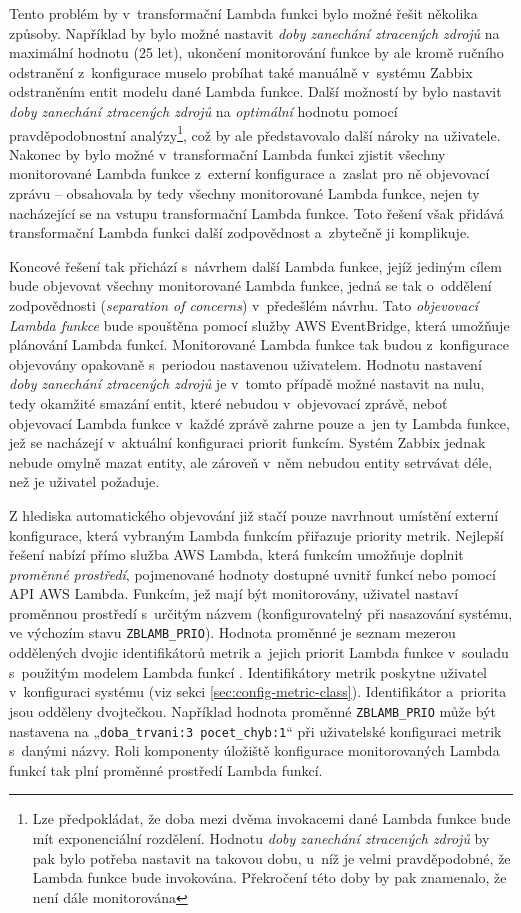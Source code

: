 \documentclass[czech, ing, kiv, he, iso690]{fasthesis}
\begin{document}
Tento problém by v~transformační Lambda funkci bylo možné řešit několika způsoby. Například by bylo možné nastavit \emph{doby zanechání ztracených zdrojů} na maximální hodnotu (25 let), ukončení monitorování funkce by ale kromě ručního odstranění z~konfigurace muselo probíhat také manuálně v~systému Zabbix odstraněním entit modelu dané Lambda funkce. Další možností by bylo nastavit \emph{doby zanechání ztracených zdrojů} na \emph{optimální} hodnotu pomocí pravděpodobnostní analýzy\footnote{Lze předpokládat, že doba mezi dvěma invokacemi dané Lambda funkce bude mít exponenciální rozdělení. Hodnotu \emph{doby zanechání ztracených zdrojů} by pak bylo potřeba nastavit na takovou dobu, u~níž je velmi pravděpodobné, že Lambda funkce bude invokována. Překročení této doby by pak znamenalo, že není dále monitorována}, což by ale představovalo další nároky na uživatele. Nakonec by bylo možné v~transformační Lambda funkci zjistit všechny monitorované Lambda funkce z~externí konfigurace a~zaslat pro ně objevovací zprávu -- obsahovala by tedy všechny monitorované Lambda funkce, nejen ty nacházející se na vstupu transformační Lambda funkce. Toto řešení však přidává transformační Lambda funkci další zodpovědnost a~zbytečně ji komplikuje.

Koncové řešení tak přichází s~návrhem další Lambda funkce, jejíž jediným cílem bude objevovat všechny monitorované Lambda funkce, jedná se tak o~oddělení zodpovědnosti (\emph{separation of concerns}) v~předešlém návrhu. Tato \emph{objevovací Lambda funkce} bude spouštěna pomocí služby AWS EventBridge, která umožňuje plánování Lambda funkcí. Monitorované Lambda funkce tak budou z~konfigurace objevovány opakovaně s~periodou nastavenou uživatelem. Hodnotu nastavení \emph{doby zanechání ztracených zdrojů} je v~tomto případě možné nastavit na nulu, tedy okamžité smazání entit, které nebudou v~objevovací zprávě, neboť objevovací Lambda funkce v~každé zprávě zahrne pouze a~jen ty Lambda funkce, jež se nacházejí v~aktuální konfiguraci priorit funkcím. Systém Zabbix jednak nebude omylně mazat entity, ale zároveň v~něm nebudou entity setrvávat déle, než je uživatel požaduje. 

Z hlediska automatického objevování již stačí pouze navrhnout umístění externí konfigurace, která vybraným Lambda funkcím přiřazuje priority metrik. Nejlepší řešení nabízí přímo služba AWS Lambda, která funkcím umožňuje doplnit \emph{proměnné prostředí}, pojmenované hodnoty dostupné uvnitř funkcí nebo pomocí API AWS Lambda. Funkcím, jež mají být monitorovány, uživatel nastaví proměnnou prostředí s~určitým názvem (konfigurovatelný při nasazování systému, ve výchozím stavu \verb|ZBLAMB_PRIO|). Hodnota proměnné je seznam mezerou oddělených dvojic identifikátorů metrik a~jejich priorit Lambda funkce v~souladu s~použitým modelem Lambda funkcí . Identifikátory metrik poskytne uživatel v~konfiguraci systému (viz sekci \ref{sec:config-metric-class}). Identifikátor a~priorita jsou odděleny dvojtečkou. Například hodnota proměnné \verb|ZBLAMB_PRIO| může být nastavena na „\verb|doba_trvani:3 pocet_chyb:1|“ při uživatelské konfiguraci metrik s~danými názvy. Roli komponenty úložiště konfigurace monitorovaných Lambda funkcí tak plní proměnné prostředí Lambda funkcí.
\end{document}
